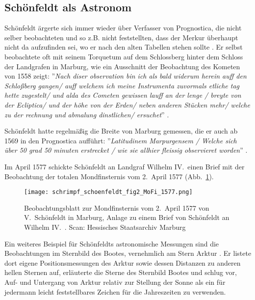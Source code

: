\documentclass[12pt]{article}
\begin{document}
\subsection{Schönfeldt als Astronom}
\label{sec_schoenfeldt_astronom}

Schönfeldt ärgerte sich immer wieder über Verfasser von Prognostica, die nicht selber beobachteten und so z.B. nicht feststellten, dass der Merkur überhaupt nicht da aufzufinden sei, wo er nach den alten Tabellen stehen sollte \cite{Schoenfeldt1561}. Er selbst beobachtete oft mit seinem Torquetum auf dem Schlossberg hinter dem Schloss der Landgrafen in Marburg, wie ein Ausschnitt der Beobachtung des Kometen von 1558 zeigt: ''\emph{Nach diser observation bin	
ich als bald widerum herein auff den Schloßberg gangen/ auff welchem ich meine Instrumenta zuvormals etliche tag hette zugestelt/ und alda des Cometen gewissen lauff an der lenge / breyte von der Ecliptica/ und der höhe von der Erden/ neben anderen Stücken mehr/ welche zu der rechnung und abmalung dinstlichen/ ersuchet}'' \cite{Schoenfeldt1558}.

Schönfeldt hatte regelmäßig die Breite von Marburg gemessen, die er auch ab 1569 in den Prognostica aufführt: ''\emph{Latitudinem Marpurgensem / Welche sich über 50 grad 50 minuten erstrecket / wie sie allhier fleissig observieret worden}'' \cite{Schoenfeldt1570}. 

Im April 1577 schickte Schönfeldt an Landgraf Wilhelm IV.\ einen Brief mit der Beobachtung der totalen Mondfinsternis vom 2.\ April 1577 (Abb.\ \ref{fig_mofi_1577}).

\begin{figure}[H]
		\begin{center}
		\texttt{[image: schrimpf\_schoenfeldt\_fig2\_MoFi\_1577.png]}
		\caption{Beobachtungsblatt zur Mondfinsternis vom 2.\ April 1577 von V.\ Schönfeldt in Marburg, Anlage zu einem Brief von Schönfeldt an Wilhelm IV.\ \cite{Schoenfeldt1577b}. Scan: Hessisches Staatsarchiv Marburg}
		\label{fig_mofi_1577}		
	\end{center}
\end{figure}

Ein weiteres Beispiel für Schönfeldts astronomische Messungen sind die Beobachtungen im Sternbild des Bootes, vernehmlich am Stern Arktur \cite{Schoenfeldt1591b}. Er listete dort eigene Positionsmessungen des Arktur sowie dessen Distanzen zu anderen hellen Sternen auf, erläuterte die Sterne des Sternbild Bootes und schlug vor, Auf- und Untergang von Arktur relativ zur Stellung der Sonne als ein für jedermann leicht feststellbares Zeichen für die Jahreszeiten zu verwenden.
\end{document}
